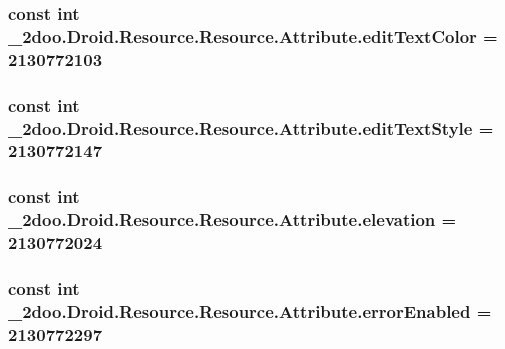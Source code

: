 \hypertarget{class__2doo_1_1_droid_1_1_resource_1_1_attribute_e72efc3f7203df2dde66e0613b77602a}{
\subsubsection[{editTextColor}]{\setlength{\rightskip}{0pt plus 5cm}const int \_\-2doo.Droid.Resource.Resource.Attribute.editTextColor = 2130772103}}
\label{class__2doo_1_1_droid_1_1_resource_1_1_attribute_e72efc3f7203df2dde66e0613b77602a}


\hypertarget{class__2doo_1_1_droid_1_1_resource_1_1_attribute_87815307c0303401ffcdcfb3015a7a75}{
\subsubsection[{editTextStyle}]{\setlength{\rightskip}{0pt plus 5cm}const int \_\-2doo.Droid.Resource.Resource.Attribute.editTextStyle = 2130772147}}
\label{class__2doo_1_1_droid_1_1_resource_1_1_attribute_87815307c0303401ffcdcfb3015a7a75}


\hypertarget{class__2doo_1_1_droid_1_1_resource_1_1_attribute_a0f13493b732502e9f402fe9f63756b3}{
\subsubsection[{elevation}]{\setlength{\rightskip}{0pt plus 5cm}const int \_\-2doo.Droid.Resource.Resource.Attribute.elevation = 2130772024}}
\label{class__2doo_1_1_droid_1_1_resource_1_1_attribute_a0f13493b732502e9f402fe9f63756b3}


\hypertarget{class__2doo_1_1_droid_1_1_resource_1_1_attribute_d177eb52edf5753a1661c1b0e62bb7a0}{
\subsubsection[{errorEnabled}]{\setlength{\rightskip}{0pt plus 5cm}const int \_\-2doo.Droid.Resource.Resource.Attribute.errorEnabled = 2130772297}}
\label{class__2doo_1_1_droid_1_1_resource_1_1_attribute_d177eb52edf5753a1661c1b0e62bb7a0}


